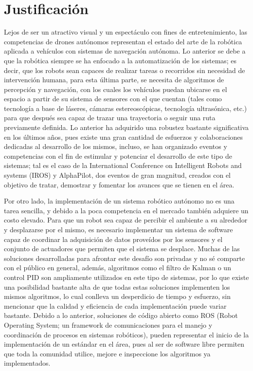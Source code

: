 \section{Justificación}
Lejos de ser un atractivo visual y un espectáculo con fines de entretenimiento, las competencias de drones autónomos representan el estado del arte de la robótica aplicada a vehículos con sistemas de navegación autónoma.
Lo anterior se debe a que la robótica siempre se ha enfocado a la automatización de los sistemas; es decir, que los robots sean capaces de realizar tareas o recorridos sin necesidad de intervención humana, para esta última parte, se necesita de algoritmos de percepción y navegación, con los cuales los vehículos puedan ubicarse en el espacio a partir de su sistema de sensores con el que cuentan (tales como tecnología a base de láseres, cámaras estereoscópicas, tecnología ultrasónica, etc.) para que después sea capaz de trazar una trayectoria o seguir una ruta previamente definida.   
Lo anterior ha adquirido una robustez bastante significativa en los últimos años, pues existe una gran cantidad de esfuerzos y colaboraciones dedicadas al desarrollo de los mismos, incluso, se han organizado eventos y competencias con el fin de estimular y potenciar el desarrollo de este tipo de sistemas; tal es el caso de la International Conference on Intelligent Robots and systems (IROS) y AlphaPilot, dos eventos de gran magnitud, creados con el objetivo de tratar, demostrar y fomentar los avances que se tienen en el área.

Por otro lado, la implementación de un sistema robótico autónomo no es una tarea sencilla, y debido a la poca competencia en el mercado también adquiere un costo elevado. 
Para que un robot sea capaz de percibir el ambiente a su alrededor y desplazarse por el mismo, es necesario implementar un sistema de software capaz de coordinar la adquisición de datos proveídos por los sensores y el conjunto de actuadores que permiten que el sistema se desplace. Muchas de las soluciones desarrolladas para afrontar este desafío son privadas y no sé comparte con el público en general, además, algoritmos como el filtro de Kalman o un control PID son ampliamente utilizados en este tipo de sistemas, por lo que existe una posibilidad bastante alta de que todas estas soluciones implementen los mismos algoritmos, lo cual conlleva un desperdicio de tiempo y esfuerzo, sin mencionar que la calidad y eficiencia de cada implementación puede variar bastante.
Debido a lo anterior, soluciones de código abierto como ROS (Robot Operating System; un framework de comunicaciones para el manejo y coordinación de procesos en sistemas robóticos), pueden representar el inicio de la implementación de un estándar en el área, pues al ser de software libre permiten que toda la comunidad utilice, mejore e inspeccione los algoritmos ya implementados.

